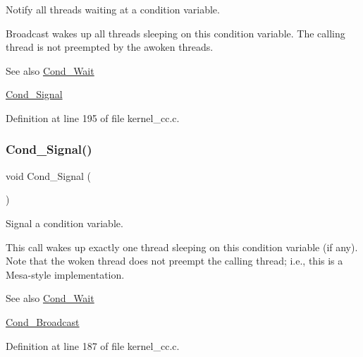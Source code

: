 Notify all threads waiting at a condition variable. 

Broadcast wakes up all threads sleeping on this condition variable. The calling thread is not preempted by the awoken threads.

\begin{DoxySeeAlso}{See also}
\hyperlink{group__syscalls_ga970dca2210b3f2ec8aedab7f542a9bf4}{Cond\+\_\+\+Wait} 

\hyperlink{group__syscalls_ga43f64f8be273d2fe77d7de5f4b81e22d}{Cond\+\_\+\+Signal} 
\end{DoxySeeAlso}


Definition at line 195 of file kernel\+\_\+cc.\+c.

\mbox{\label{group__syscalls_ga43f64f8be273d2fe77d7de5f4b81e22d}} 
\subsubsection{\texorpdfstring{Cond\+\_\+\+Signal()}{Cond\_Signal()}}
{\footnotesize\ttfamily void Cond\+\_\+\+Signal (\begin{DoxyParamCaption}\item[{\hyperlink{structCondVar}{Cond\+Var} $\ast$}]{ }\end{DoxyParamCaption})}



Signal a condition variable. 

This call wakes up exactly one thread sleeping on this condition variable (if any). Note that the woken thread does not preempt the calling thread; i.\+e., this is a Mesa-\/style implementation. \begin{DoxySeeAlso}{See also}
\hyperlink{group__syscalls_ga970dca2210b3f2ec8aedab7f542a9bf4}{Cond\+\_\+\+Wait} 

\hyperlink{group__syscalls_ga8196aa2a48cad90742f254cc3b8fd351}{Cond\+\_\+\+Broadcast} 
\end{DoxySeeAlso}


Definition at line 187 of file kernel\+\_\+cc.\+c.

\mbox{\label{group__syscalls_ga4e955b769339be9ea6a0c1bd4151c48f}} 
